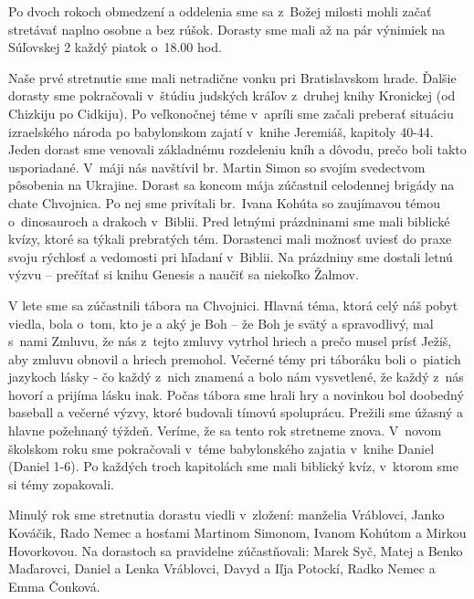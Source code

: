 


Po dvoch rokoch obmedzení a oddelenia sme sa z~Božej milosti mohli začať stretávať naplno osobne a bez rúšok. Dorasty sme mali až na pár výnimiek na Súľovskej 2 každý piatok o~18.00 hod.

Naše prvé stretnutie sme mali netradične vonku pri Bratislavskom hrade. Ďalšie dorasty sme pokračovali v~štúdiu judských kráľov z~druhej knihy Kronickej (od Chizkiju po Cidkiju). Po veľkonočnej téme v~apríli sme začali preberať situáciu izraelského národa po babylonskom zajatí v~knihe Jeremiáš, kapitoly 40-44. Jeden dorast sme venovali základnému rozdeleniu kníh a dôvodu, prečo boli takto usporiadané. V~máji nás navštívil br. Martin Simon so svojím svedectvom pôsobenia na Ukrajine. Dorast sa koncom mája zúčastnil celodennej brigády na chate Chvojnica. Po nej sme privítali br.~Ivana Kohúta so zaujímavou témou o~dinosauroch a drakoch v~Biblii. Pred letnými prázdninami sme mali biblické kvízy, ktoré sa týkali prebratých tém. Dorastenci mali možnosť uviesť do praxe svoju rýchlosť a vedomosti pri hľadaní v~Biblii. Na prázdniny sme dostali letnú výzvu -- prečítať si knihu Genesis a naučiť sa niekoľko Žalmov.

V lete sme sa zúčastnili tábora na Chvojnici. Hlavná téma, ktorá celý náš pobyt viedla, bola o~tom, kto je a aký je Boh -- že Boh je svätý a spravodlivý, mal s~nami Zmluvu, že nás z~tejto zmluvy vytrhol hriech a prečo musel prísť Ježiš, aby zmluvu obnovil a hriech premohol. Večerné témy pri táboráku boli o~piatich jazykoch lásky - čo každý z~nich znamená a bolo nám vysvetlené, že každý z~nás hovorí a prijíma lásku inak. Počas tábora sme hrali hry a novinkou bol doobedný baseball a večerné výzvy, ktoré budovali tímovú spoluprácu. Prežili sme úžasný a hlavne požehnaný týždeň. Veríme, že sa tento rok stretneme znova. V~novom školskom roku sme pokračovali v~téme babylonského zajatia v~knihe Daniel (Daniel 1-6). Po každých troch kapitolách sme mali biblický kvíz, v~ktorom sme si témy zopakovali.

Minulý rok sme stretnutia dorastu viedli v~zložení: manželia Vráblovci, Janko Kováčik, Rado Nemec a hosťami Martinom Simonom, Ivanom Kohútom a Mirkou Hovorkovou. Na dorastoch sa pravidelne zúčastňovali: Marek Syč, Matej a Benko Maďarovci, Daniel a Lenka Vráblovci, Davyd a Iľja Potockí, Radko Nemec a Emma Čonková.

